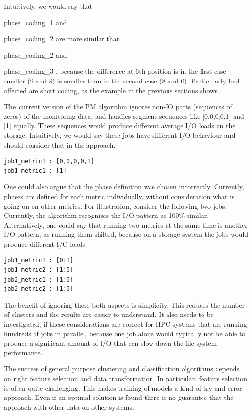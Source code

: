 \documentclass[]{llncs}
\begin{document}
Intuitively, we would say that {phase\_coding\_1 and{ phase\_coding\_2 are more similar than {phase\_coding\_2 and {phase\_coding\_3 , because the difference at 6th position is in the first case smaller (9 and 8) is smaller than in the second case (8 and 0).
Particularly bad affected are short coding, as the example in the previous sections shows.

The\ current version of the PM algorithm ignores non-IO parts (sequences of zeros) of the monitoring data, and  handles segment sequences like [0,0,0,0,1] and [1] equally.
These sequences would produce different average I/O loads on the storage.
Intuitively, we would say these jobs have different I/O behaviour and should consider that in the approach.

\begin{lstlisting}
job1_metric1 : [0,0,0,0,1]
job1_metric1 : [1]
\end{lstlisting}

One could also argue that the phase definition was chosen incorrectly.
Currently, phases are defined for each metric individually, without consideration what is going on on other metrics.
For illustration, consider the following two jobs.
Currently, the algorithm recognizes the I/O pattern as 100$\%$  similar.
Alternatively, one could say that running two metrics at the same time is another I/O pattern, as running them shifted, because on a storage system the jobs would produce different I/O loads.

\begin{lstlisting}
job1_metric1 : [0:1]
job1_metric2 : [1:0]
job2_metric1 : [1:0]
job2_metric2 : [1:0]
\end{lstlisting}

The benefit of ignoring these both aspects is simplicity.
This reduces the number of clusters and the results are easier to understand.
It also needs to be investigated, if these considerations are correct for HPC systems that are running hundreds of jobs in parallel, because one job alone would typically not be able to produce a significant amount of I/O that can slow down the file system performance.

The success of general purpose clustering and classification algorithms depends on right feature selection and data transformation.
In particular, feature selection is often quite challenging.
This makes training of models a kind of try and error approach.
Even if an optimal solution is found there is no guarantee that the approach with other data on other systems.

}}}}
\end{document}
